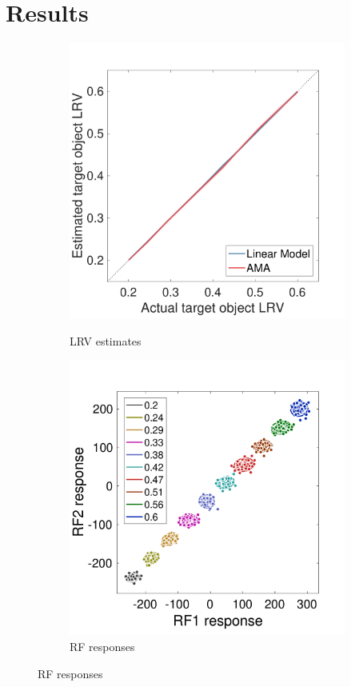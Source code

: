 \documentclass{jov}
\begin{document}
\section{Results} \label{Results}
\begin{figure}
\centering
            \begin{subfigure}[b]{0.25 \textwidth}
        \caption{LRV estimates}
        \includegraphics[width=\textwidth, trim={0 0 0 1.3cm},clip]{../FiguresDraft5/Figure10/Figure10_a.pdf}
        \label{fig:case1Estimates}
    \end{subfigure} 
        \begin{subfigure}[b]{0.26 \textwidth}
        \caption{RF responses}
        \includegraphics[width=\textwidth, trim={0 3mm 0 15mm},clip]{../FiguresDraft5/Figure10/Figure10_b.pdf}

\end{subfigure}
\end{figure}
\end{document}
